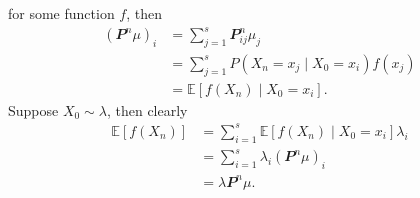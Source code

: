 \documentclass[math, code]{amznotes}
\theoremstyle{remark}
\begin{document}
for some function $f$, then 
\begin{align*}
    \left(\mathbfit{P}^n\mu\right)_i & = \sum_{j = 1}^{s}\mathbfit{P}^n_{ij}\mu_j \\
    & = \sum_{j = 1}^{s}P\left(X_n = x_j \mid X_0 = x_i\right)f\left(x_j\right) \\
    & = \mathbb{E}\left[f\left(X_n\right) \mid X_0 = x_i\right].
\end{align*}
Suppose $X_0 \sim \lambda$, then clearly 
\begin{align*}
    \mathbb{E}\left[f\left(X_n\right)\right] & = \sum_{i = 1}^{s}\mathbb{E}\left[f\left(X_n\right) \mid X_0 = x_i\right]\lambda_i \\
    & = \sum_{i = 1}^{s}\lambda_i\left(\mathbfit{P}^n\mu\right)_i \\
    & = \lambda\mathbfit{P}^n\mu.
\end{align*}
\end{document}
